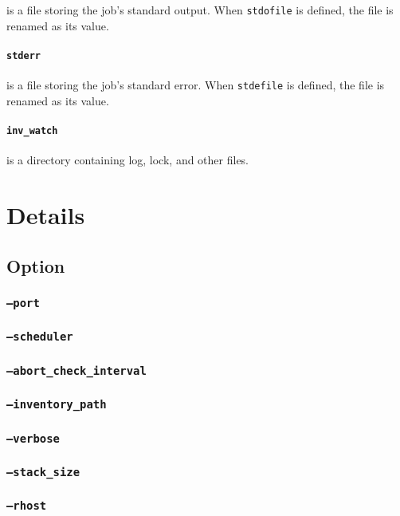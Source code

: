 \documentclass[a4paper,10pt]{report}
\begin{document}
is a file storing the job's standard output.  When \texttt{stdofile}
is defined, the file is renamed as its value.

\subsection*{\texttt{stderr}}

is a file storing the job's standard error.  When \texttt{stdefile}
is defined, the file is renamed as its value.

\subsection*{\texttt{inv\_watch}}

is a directory containing log, lock, and other files.

\part{Details}

\chapter{Option}\label{chapoption}

\section{\texttt{--port}}
\section{\texttt{--scheduler}}
\section{\texttt{--abort\_check\_interval}}
\section{\texttt{--inventory\_path}}
\section{\texttt{--verbose}}
\section{\texttt{--stack\_size}}
\section{\texttt{--rhost}}
\end{document}
